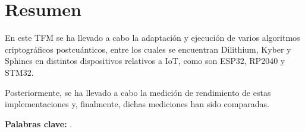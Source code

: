 %
%
%
% 
%
%
%
%

\chapter*{Resumen}\label{cha:resumen}


En este TFM se ha llevado a cabo la adaptación y ejecución de varios algoritmos criptográficos postcuánticos, entre los cuales se encuentran Dilithium, Kyber y Sphincs en distintos dispositivos relativos a IoT, como son ESP32, RP2040 y STM32.

Posteriormente, se ha llevado a cabo la medición de rendimiento de estas implementaciones y, finalmente, dichas mediciones han sido comparadas.

\textbf{Palabras clave:} \myThesisKeywords. %



